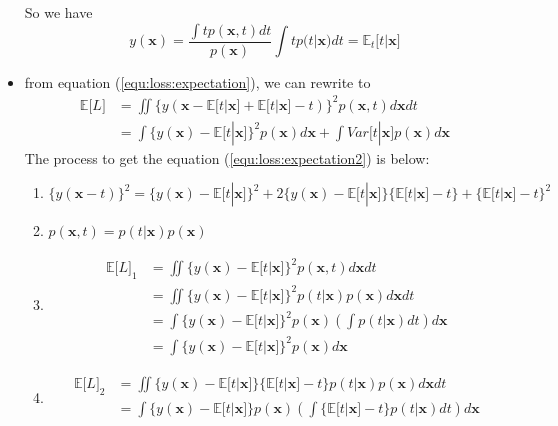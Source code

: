 \documentclass[12pt, a4paper]{article}
\begin{document}
\begin{itemize}
        So we have
        \[
            y(\bm{x})=\frac{\int tp(\bm{x},t)dt}{p(\bm{x})}\int tp(t|\bm{x})dt=
            \mathbb{E}_t\lbrack t|\bm{x}\rbrack
            \]
        \item from equation (\ref{equ:loss:expectation}), we can rewrite to
        \begin{align}
            \mathbb{E}\lbrack L\rbrack&=\iint\{y(\bm{x}-\mathbb{E}\lbrack t|\bm{x}\rbrack
            +\mathbb{E}\lbrack t|\bm{x}\rbrack-t)\}^2p(\bm{x},t)d\bm{x}dt\nonumber\\
            \label{equ:loss:expectation2}
            &=\int\{y(\bm{x})-\mathbb{E}\lbrack t|\bm{x}\rbrack\}^2p(\bm{x})d\bm{x}+
            \int Var\lbrack t|\bm{x}\rbrack p(\bm{x})d\bm{x}
        \end{align}
        The process to get the equation (\ref{equ:loss:expectation2}) is below:
        \begin{enumerate}
            \item $\{y(\bm{x}-t)\}^2=\{y(\bm{x})-\mathbb{E}\lbrack t|\bm{x}\rbrack\}^2
            +2\{y(\bm{x})-\mathbb{E}\lbrack t|\bm{x}\rbrack\}\{\mathbb{E}\lbrack t|\bm{x}
            \rbrack-t\}+\{\mathbb{E}\lbrack t|\bm{x}\rbrack-t\}^2$
            \item $p(\bm{x},t)=p(t|\bm{x})p(\bm{x})$
            \item \begin{align*}
            \mathbb{E}\lbrack L\rbrack_1&=\iint\{y(\bm{x})-\mathbb{E}\lbrack t|\bm{x}
            \rbrack\}^2p(\bm{x},t)d\bm{x}dt\\
            &=\iint\{y(\bm{x})-\mathbb{E}\lbrack t|\bm{x}\rbrack\}^2p(t|\bm{x})p(\bm{x})d\bm{x}dt\\
            &=\int\{y(\bm{x})-\mathbb{E}\lbrack t|\bm{x}\rbrack\}^2p(\bm{x})
            (\int p(t|\bm{x})dt)d\bm{x}\\
            &=\int\{y(\bm{x})-\mathbb{E}\lbrack t|\bm{x}\rbrack\}^2p(\bm{x})d\bm{x}
            \end{align*}
            \item \begin{align*}
                \mathbb{E}\lbrack L\rbrack_2&=\iint\{y(\bm{x})-\mathbb{E}\lbrack t|\bm{x}\rbrack\}
                \{\mathbb{E}\lbrack t|\bm{x}\rbrack-t\}p(t|\bm{x})p(\bm{x})d\bm{x}dt\\
                &=\int\{y(\bm{x})-\mathbb{E}\lbrack t|\bm{x}\rbrack\}p(\bm{x})
                (\int\{\mathbb{E}\lbrack t|\bm{x}\rbrack-t\}p(t|\bm{x})dt)d\bm{x}\\

\end{align*}
\end{enumerate}
\end{itemize}
\end{document}
